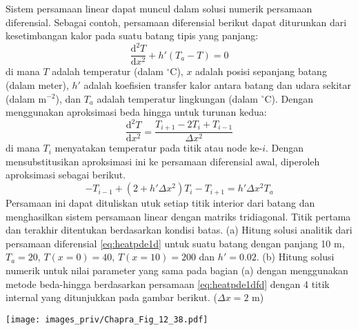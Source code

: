 \begin{soal}
Sistem persamaan linear dapat muncul dalam solusi numerik
persamaan diferensial. Sebagai contoh, persamaan diferensial
berikut dapat diturunkan dari kesetimbangan kalor
pada suatu batang tipis yang panjang:
\begin{equation*}
\frac{\mathrm{d}^2 T}{\mathrm{d}x^2} + h'(T_{a} - T) = 0
\end{equation*}
di mana $T$ adalah temperatur (dalam $^{\circ}\mathrm{C}$),
$x$ adalah posisi sepanjang batang (dalam meter), $h'$ adalah
koefisien transfer kalor antara batang dan udara sekitar (dalam
$\mathrm{m}^{-2}$), dan $T_{a}$ adalah temperatur lingkungan
(dalam $^{\circ}\mathrm{C}$). Dengan menggunakan aproksimasi
beda hingga untuk turunan kedua:
\begin{equation}
\frac{\mathrm{d}^2 T}{\mathrm{d}x^2} = \frac{T_{i+1} - 2T_{i} + T_{i-1}}{\Delta x^2}
\label{eq:heatpde1d}
\end{equation}
di mana $T_{i}$ menyatakan temperatur pada titik atau node ke-$i$.
Dengan mensubstitusikan aproksimasi ini ke persamaan diferensial awal,
diperoleh aproksimasi sebagai berikut.
\begin{equation}
-T_{i-1} + (2 + h'\Delta x^2)T_{i} - T_{i+1} = h'\Delta x^2 T_{a}
\label{eq:heatpde1dfd}
\end{equation}
Persamaan ini dapat dituliskan utuk setiap titik interior dari batang dan menghasilkan
sistem persamaan linear dengan matriks tridiagonal.
Titik pertama dan terakhir ditentukan berdasarkan kondisi batas.
(a) Hitung solusi analitik dari persamaan diferensial \eqref{eq:heatpde1d}
untuk suatu batang dengan panjang 10 m, $T_a = 20$, $T(x=0) = 40$, 
$T(x=10) = 200$ dan $h' = 0.02$.
(b) Hitung solusi numerik untuk nilai parameter yang sama pada bagian (a) dengan
menggunakan metode beda-hingga berdasarkan persamaan \eqref{eq:heatpde1dfd}
dengan 4 titik internal yang ditunjukkan pada gambar berikut.
($\Delta x = 2$ m)

{\centering
\texttt{[image: images\_priv/Chapra\_Fig\_12\_38.pdf]}
\par}

\end{soal}